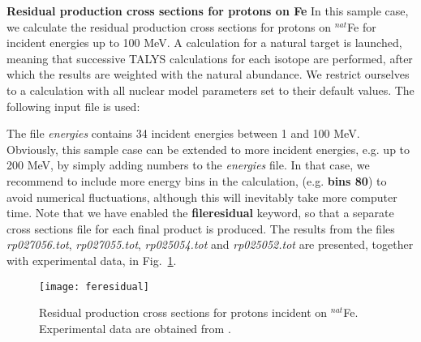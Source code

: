 \begin{samplecase}
{\bf Residual production cross sections for protons on Fe}\newline
In this sample case, we calculate the residual production cross sections for
protons on ${}^{nat}$Fe for incident energies up to 100 MeV. A calculation for
a natural target is launched, meaning that successive TALYS calculations for
each isotope are performed, after which the results are weighted with the
natural abundance. We restrict ourselves to a calculation with all
nuclear model parameters set to their default values.
The following input file is used:


The file {\em energies} contains 34 incident energies between 1 and 100 MeV.
Obviously, this sample case can be extended to more incident energies, e.g. up
to 200 MeV, by simply adding numbers to the {\em energies} file. In that case,
we recommend to include more energy bins in the
calculation, (e.g. {\bf bins 80}) to avoid numerical fluctuations, although
this will inevitably take more computer time.
Note that we have enabled the {\bf fileresidual} keyword, so that a separate
cross sections file for each final product is produced.
The results from the files {\em rp027056.tot}, {\em rp027055.tot},
{\em rp025054.tot} and {\em rp025052.tot} are
presented, together with experimental data, in Fig.~\ref{resprod}.
\end{samplecase}
\begin{figure}
\centering\texttt{[image: feresidual]}
\caption{Residual production cross sections for protons incident
on ${}^{nat}$Fe. Experimental data are obtained from \protect\cite{Michel1997}.}
\label{resprod}
\end{figure}

